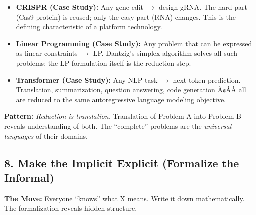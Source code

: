 \begin{itemize}
\item \textbf{CRISPR (Case Study):} Any gene edit $\to$ design gRNA. The hard part (Cas9 protein) is reused; only the easy part (RNA) changes. This is the defining characteristic of a platform technology.

\item \textbf{Linear Programming (Case Study):} Any problem that can be expressed as linear constraints $\to$ LP. Dantzig's simplex algorithm solves all such problems; the LP formulation itself is the reduction step.

\item \textbf{Transformer (Case Study):} Any NLP task $\to$ next-token prediction. Translation, summarization, question answering, code generation Ã¢ÂÂ all are reduced to the same autoregressive language modeling objective.
\end{itemize}

\begin{mentalLeap}\textbf{Pattern:} \emph{Reduction is translation.} Translation of Problem A into Problem B reveals understanding of both. The ``complete'' problems are the \emph{universal languages} of their domains.\end{mentalLeap}
\subsection{8. Make the Implicit Explicit (Formalize the Informal)}
\label{sec:anatomy:formalize}

\textbf{The Move:} Everyone ``knows'' what X means. Write it down mathematically. The formalization reveals hidden structure.

